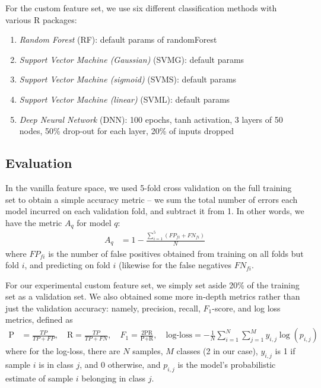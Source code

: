 \documentclass{article} %
\begin{document}
For the custom feature set, we use six different classification methods with various R packages:
\begin{enumerate}
\item \emph{Random Forest} (RF): default params of randomForest
\item \emph{Support Vector Machine (Gaussian)} (SVMG): default params
\item \emph{Support Vector Machine (sigmoid)} (SVMS): default params
\item \emph{Support Vector Machine (linear)} (SVML): default params
\item \emph{Deep Neural Network} (DNN): 100 epochs, tanh activation, 3 layers of 50 nodes, 50\% drop-out for each layer, 20\% of inputs dropped
\end{enumerate}
\subsection{Evaluation}
In the vanilla feature space, we used 5-fold cross validation on the full training set to obtain a simple accuracy metric -- we sum the total number of errors each model incurred on each validation fold, and subtract it from 1.  In other words, we have the metric $A_q$ for model $q$:
\begin{align*}
A_q &= 1 - \frac{\sum_{i=1}^5(FP_{fi} + FN_{fi})}{N}
\end{align*}
where $FP_{fi}$ is the number of false positives obtained from training on all folds but fold $i$, and predicting on fold $i$ (likewise for the false negatives $FN_{fi}$.\par
For our experimental custom feature set, we simply set aside 20\% of the training set as a validation set.  We also obtained some more in-depth metrics rather than just the validation accuracy: namely, precision, recall, $F_1$-score, and log loss metrics, defined as
\begin{align*}
\text{P} &= \frac{TP}{TP + FP}, \hspace{1em} \text{R} = \frac{TP}{TP + FN}, \hspace{1em} F_1 = \frac{2\text{PR}}{\text{P} + \text{R}}, \hspace{1em} \text{log-loss} = -\frac{1}{N}\sum_{i=1}^N\sum_{j=1}^My_{i,j}\log(p_{i,j})
\end{align*}
where for the log-loss, there are $N$ samples, $M$ classes (2 in our case), $y_{i,j}$ is 1 if sample $i$ is in class $j$, and 0 otherwise, and $p_{i,j}$ is the model's probabilistic estimate of sample $i$ belonging in class $j$.
\end{document}
